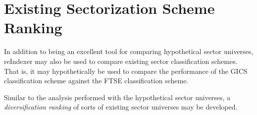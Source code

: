 \documentclass[../main.tex]{subfiles}
\begin{document}
\section{Existing Sectorization Scheme Ranking}

In addition to being an excellent tool for comparing hypothetical sector universes, reIndexer may also be used to compare existing sector classification schemes. That is, it may hypothetically be used to compare the performance of the GICS classification scheme against the FTSE classification scheme.

Similar to the analysis performed with the hypothetical sector universes, a \textit{diversification ranking} of sorts of existing sector universes may be developed.
\end{document}
